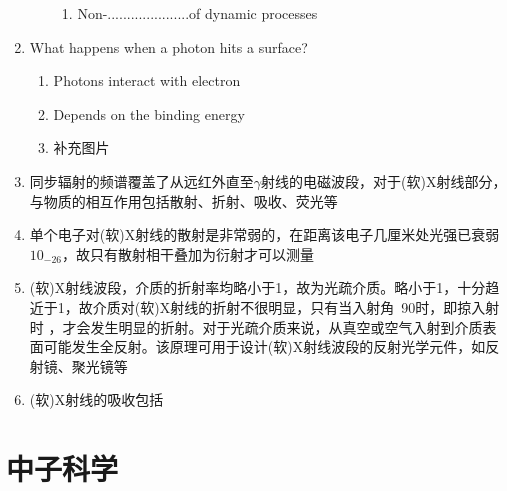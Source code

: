 \documentclass[12pt,a4paper]{article}
\begin{document}
\begin{enumerate}
\begin{enumerate}
\begin{enumerate}
                        \item Non-.....................of dynamic processes
                    \end{enumerate}
                \end{enumerate}
        \item What happens when a photon hits a surface?
            \begin{enumerate}
               \item Photons interact with electron
               \item Depends on the binding energy
               \item 补充图片 
            \end{enumerate}
        \item 同步辐射的频谱覆盖了从远红外直至$\gamma$射线的电磁波段，对于(软)X射线部分，与物质的相互作用包括散射、折射、吸收、荧光等
        \item 单个电子对(软)X射线的散射是非常弱的，在距离该电子几厘米处光强已衰弱$10_{-26}$，故只有散射相干叠加为衍射才可以测量
        \item (软)X射线波段，介质的折射率均略小于1，故为光疏介质。略小于1，十分趋近于1，故介质对(软)X射线的折射不很明显，只有当入射角~90时，即掠入射时
            ，才会发生明显的折射。对于光疏介质来说，从真空或空气入射到介质表面可能发生全反射。该原理可用于设计(软)X射线波段的反射光学元件，如反射镜、聚光镜等
        \item (软)X射线的吸收包括
    \end{enumerate}
\section{中子科学}
\end{document}
